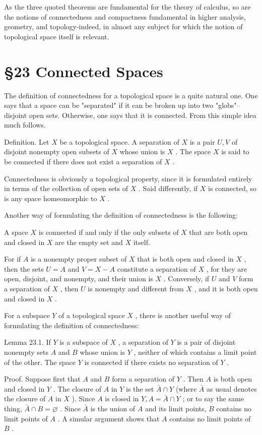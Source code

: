 \documentclass[10pt]{article}
\begin{document}
As the three quoted theorems are fundamental for the theory of calculus, so are the notions of connectedness and compactness fundamental in higher analysis, geometry, and topology-indeed, in almost any subject for which the notion of topological space itself is relevant.

\section*{§23 Connected Spaces}

The definition of connectedness for a topological space is a quite natural one. One says that a space can be "separated" if it can be broken up into two "globs"--disjoint open sets. Otherwise, one says that it is connected. From this simple idea much follows.

Definition. Let \(X\) be a topological space. A separation of \(X\) is a pair \(U,V\) of disjoint nonempty open subsets of \(X\) whose union is \(X\) . The space \(X\) is said to be connected if there does not exist a separation of \(X\) .

Connectedness is obviously a topological property, since it is formulated entirely in terms of the collection of open sets of \(X\) . Said differently, if \(X\) is connected, so is any space homeomorphic to \(X\) .

Another way of formulating the definition of connectedness is the following:

A space \(X\) is connected if and only if the only subsets of \(X\) that are both open and closed in \(X\) are the empty set and \(X\) itself.

For if \(A\) is a nonempty proper subset of \(X\) that is both open and closed in \(X\) , then the sets \(U = A\) and \(V = X - A\) constitute a separation of \(X\) , for they are open, disjoint, and nonempty, and their union is \(X\) . Conversely, if \(U\) and \(V\) form a separation of \(X\) , then \(U\) is nonempty and different from \(X\) , and it is both open and closed in \(X\) .

For a subspace \(Y\) of a topological space \(X\) , there is another useful way of formulating the definition of connectedness:

Lemma 23.1. If \(Y\) is a subspace of \(X\) , a separation of \(Y\) is a pair of disjoint nonempty sets \(A\) and \(B\) whose union is \(Y\) , neither of which contains a limit point of the other. The space \(Y\) is connected if there exists no separation of \(Y\) .

Proof. Suppose first that \(A\) and \(B\) form a separation of \(Y\) . Then \(A\) is both open and closed in \(Y\) . The closure of \(A\) in \(Y\) is the set \(\bar{A} \cap  Y\) (where \(\bar{A}\) as usual denotes the closure of \(A\) in \(X\) ). Since \(A\) is closed in \(Y,A = \bar{A} \cap  Y\) ; or to say the same thing, \(\bar{A} \cap  B = \varnothing\) . Since \(\bar{A}\) is the union of \(A\) and its limit points, \(B\) contains no limit points of \(A\) . A simular argument shows that \(A\) contains no limit points of \(B\) .
\end{document}
